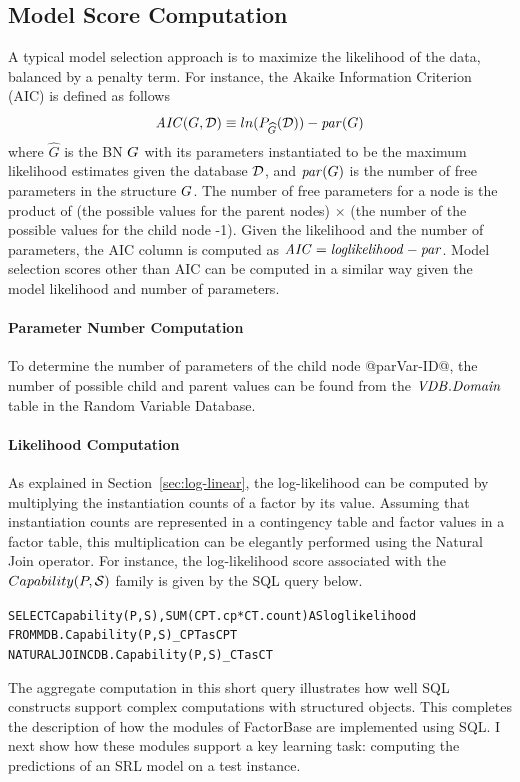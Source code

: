 \documentclass{sfuthesis}
\begin{document}
\subsection{Model Score Computation} \label{sec:model-score}
A typical model selection approach is to maximize the likelihood of the data, balanced by a penalty term. For instance, the Akaike Information Criterion (AIC) is defined as follows 
\[\mathit{AIC}(\G,\D) \equiv ln(P_{\widehat{G}}(\D)) - \parameters(\G) \]
where $\widehat{G}$ is the BN $\G$ with its parameters instantiated to be the maximum likelihood estimates given the database $\D$, and $\parameters(\G)$ is the number of free parameters in the structure $\G$. 
The number of free parameters for a node is the product of (the possible values for the parent nodes) $\times$ (the number of the possible values for the child node -1). Given the likelihood and the number of parameters, the AIC column is computed as $\aic = \loglikelihood - \parameters$. 
 Model selection scores other than AIC can be computed in a similar way given the model likelihood and number of parameters.

\paragraph{Parameter Number Computation} To determine the number of parameters of the child node @parVar-ID@, the number of possible child and parent values can be found from the $\it{\RVD.Domain}$ table in the Random Variable Database.  

\paragraph{Likelihood Computation} As explained in Section~\ref{sec:log-linear}, the log-likelihood can be computed by multiplying the instantiation counts of a factor by its value. Assuming that instantiation counts are represented in a contingency table and factor values in a factor table, this multiplication can be elegantly performed using the Natural Join operator. For instance, the log-likelihood score associated with the $Capability(\P,\S)$ family is given by the SQL query below.

\begin{alltt}
SELECT Capability(P,S),  SUM(CPT.cp * CT.count) AS loglikelihood
FROM MDB.Capability(P,S)\_CPT as CPT
NATURAL JOIN CDB.Capability(P,S)\_CT as CT
\end{alltt}

The aggregate computation in this short query illustrates how well SQL constructs support complex computations with structured objects. This completes the description of how the modules of FactorBase  are implemented using SQL. I  next show how these modules support a key learning task: computing the predictions of an SRL model on a test instance. 
\end{document}
